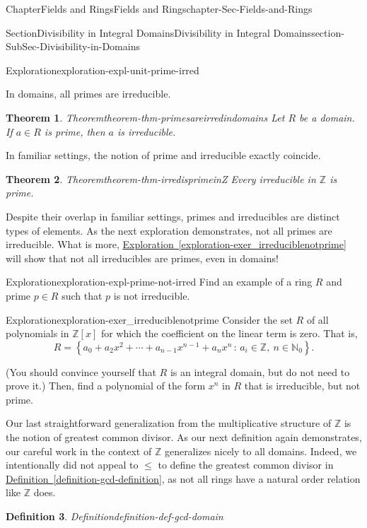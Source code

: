 \documentclass[oneside,10pt,]{book}
\newcommand{\xreffont}{\relax}
\numberwithin{equation}{section}
\renewcommand{\le}{\leqslant}
\newcommand{\setof}[2]{{\left\{#1\,\colon\,#2\right\}}}
\def\Z{{\mathbb Z}}
\def\N{{\mathbb N}}
\newtheorem{theorem}{Theorem}[section]
\newtheorem{definition}[theorem]{Definition}
\begin{document}
\begin{chapterptx}{Chapter}{Fields and Rings}{}{Fields and Rings}{}{}{chapter-Sec-Fields-and-Rings}
\begin{sectionptx}{Section}{Divisibility in Integral Domains}{}{Divisibility in Integral Domains}{}{}{section-SubSec-Divisibility-in-Domains}
\begin{exploration}{Exploration}{}{exploration-expl-unit-prime-irred}
\end{exploration}%
In domains, all primes are irreducible.%
\begin{theorem}{Theorem}{}{}{theorem-thm-primesareirredindomains}%
Let \(R\) be a domain. If \(a\in R\) is prime, then \(a\) is irreducible.%
\end{theorem}
In familiar settings, the notion of prime and irreducible exactly coincide.%
\begin{theorem}{Theorem}{}{}{theorem-thm-irredisprimeinZ}%
Every irreducible in \(\Z\) is prime.%
\end{theorem}
Despite their overlap in familiar settings, primes and irreducibles are distinct types of elements. As the next exploration demonstrates, not all primes are irreducible. What is more, \hyperref[exploration-exer_irreduciblenotprime]{Exploration~{\xreffont\ref{exploration-exer_irreduciblenotprime}}} will show that not all irreducibles are primes, even in domains!%
\begin{exploration}{Exploration}{}{exploration-expl-prime-not-irred}%
Find an example of a ring \(R\) and prime \(p\in R\) such that \(p\) is not irreducible.%
\end{exploration}%
\begin{exploration}{Exploration}{}{exploration-exer_irreduciblenotprime}%
Consider the set \(R\) of all polynomials in \(\Z[x]\) for which the coefficient on the linear term is zero. That is,%
\begin{equation*}
R = \setof{a_0 + a_2 x^2 + \cdots + a_{n-1} x^{n-1} + a_n x^n}{a_i\in \Z,\ n\in\N_0}\text{.}
\end{equation*}
%
\par
(You should convince yourself that \(R\) is an integral domain, but do not need to prove it.) Then, find a polynomial of the form \(x^n\) in \(R\) that is irreducible, but not prime.%
\end{exploration}%
Our last straightforward generalization from the multiplicative structure of \(\Z\) is the notion of greatest common divisor. As our next definition again demonstrates, our careful work in the context of \(\Z\) generalizes nicely to all domains. Indeed, we intentionally did not appeal to \(\le\) to define the greatest common divisor in \hyperref[definition-gcd-definition]{Definition~{\xreffont\ref{definition-gcd-definition}}}, as not all rings have a natural order relation like \(\Z\) does.%
\begin{definition}{Definition}{}{definition-def-gcd-domain}%
%

\end{definition}
\end{sectionptx}
\end{chapterptx}
\end{document}

